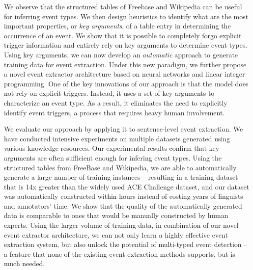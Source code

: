 We observe that the structured tables of Freebase and Wikipedia can be useful for inferring event types. We then design heuristics to
identify what are the most important properties, or \emph{key arguments},  of a table entry in determining the occurrence of an event. We
show that it is possible to completely forgo explicit trigger information and entirely rely on key arguments to determine event types.
Using key arguments, we can now develop an \emph{automatic} approach to generate training data for event extraction. Under this new \DS
paradigm, we further propose a novel event extractor architecture based on neural networks and linear integer programming. One of the key
innovations of our approach is that the model does not rely on explicit triggers. Instead, it uses a set of key arguments to characterize
an event type. As a result, it eliminates the need to explicitly identify event triggers, a process that requires heavy human involvement.

We evaluate our approach by applying it to sentence-level event extraction. We have conducted intensive experiments on multiple datasets
generated using various knowledge resources. Our experimental results confirm that key arguments are often sufficient enough for infering
event types. 
Using the structured tables from FreeBase and Wikipedia, we are able to automatically generate a large number of training
instances -- resulting in a training dataset that is 14x greater than the widely used ACE Challenge dataset\cite{doddington2004automatic}, and our dataset was automatically constructed within hours instead of costing years of linguists and annotators' time. We show that the quality of the automatically
generated data is comparable to ones that would be manually constructed by human experts. Using the larger volume of training data, in
combination of our novel event extractor architecture, we can not only learn a highly effective event extraction system, but also unlock
the potential of multi-typed event detection -- a feature that none of the existing event extraction methods supports, but is much needed.


